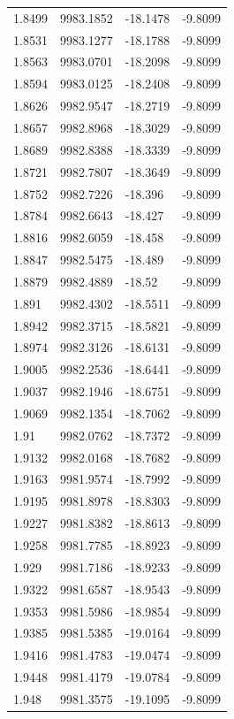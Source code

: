\begin{table}[H]
\begin{tabular}{llll}
1.8499 & 9983.1852 & -18.1478 & -9.8099 \\
1.8531 & 9983.1277 & -18.1788 & -9.8099 \\
1.8563 & 9983.0701 & -18.2098 & -9.8099 \\
1.8594 & 9983.0125 & -18.2408 & -9.8099 \\
1.8626 & 9982.9547 & -18.2719 & -9.8099 \\
1.8657 & 9982.8968 & -18.3029 & -9.8099 \\
1.8689 & 9982.8388 & -18.3339 & -9.8099 \\
1.8721 & 9982.7807 & -18.3649 & -9.8099 \\
1.8752 & 9982.7226 & -18.396 & -9.8099 \\
1.8784 & 9982.6643 & -18.427 & -9.8099 \\
1.8816 & 9982.6059 & -18.458 & -9.8099 \\
1.8847 & 9982.5475 & -18.489 & -9.8099 \\
1.8879 & 9982.4889 & -18.52 & -9.8099 \\
1.891 & 9982.4302 & -18.5511 & -9.8099 \\
1.8942 & 9982.3715 & -18.5821 & -9.8099 \\
1.8974 & 9982.3126 & -18.6131 & -9.8099 \\
1.9005 & 9982.2536 & -18.6441 & -9.8099 \\
1.9037 & 9982.1946 & -18.6751 & -9.8099 \\
1.9069 & 9982.1354 & -18.7062 & -9.8099 \\
1.91 & 9982.0762 & -18.7372 & -9.8099 \\
1.9132 & 9982.0168 & -18.7682 & -9.8099 \\
1.9163 & 9981.9574 & -18.7992 & -9.8099 \\
1.9195 & 9981.8978 & -18.8303 & -9.8099 \\
1.9227 & 9981.8382 & -18.8613 & -9.8099 \\
1.9258 & 9981.7785 & -18.8923 & -9.8099 \\
1.929 & 9981.7186 & -18.9233 & -9.8099 \\
1.9322 & 9981.6587 & -18.9543 & -9.8099 \\
1.9353 & 9981.5986 & -18.9854 & -9.8099 \\
1.9385 & 9981.5385 & -19.0164 & -9.8099 \\
1.9416 & 9981.4783 & -19.0474 & -9.8099 \\
1.9448 & 9981.4179 & -19.0784 & -9.8099 \\
1.948 & 9981.3575 & -19.1095 & -9.8099 \\

\end{tabular}
\end{table}
